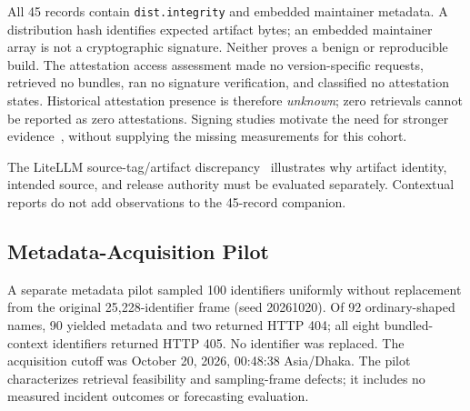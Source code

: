 All 45 records contain \texttt{dist.integrity} and embedded maintainer metadata. A distribution hash identifies expected artifact bytes; an embedded maintainer array is not a cryptographic signature. Neither proves a benign or reproducible build. The attestation access assessment made no version-specific requests, retrieved no bundles, ran no signature verification, and classified no attestation states. Historical attestation presence is therefore \emph{unknown}; zero retrievals cannot be reported as zero attestations. Signing studies motivate the need for stronger evidence~\cite{okafor2025,schorlemmer2024}, without supplying the missing measurements for this cohort.

The LiteLLM source-tag/artifact discrepancy~\cite{litellmincident2026} illustrates why artifact identity, intended source, and release authority must be evaluated separately. Contextual reports do not add observations to the 45-record companion.

\subsection{Metadata-Acquisition Pilot}
A separate metadata pilot sampled 100 identifiers uniformly without replacement from the original 25,228-identifier frame (seed 20261020). Of 92 ordinary-shaped names, 90 yielded metadata and two returned HTTP 404; all eight bundled-context identifiers returned HTTP 405. No identifier was replaced. The acquisition cutoff was October 20, 2026, 00:48:38 Asia/Dhaka. The pilot characterizes retrieval feasibility and sampling-frame defects; it includes no measured incident outcomes or forecasting evaluation.
